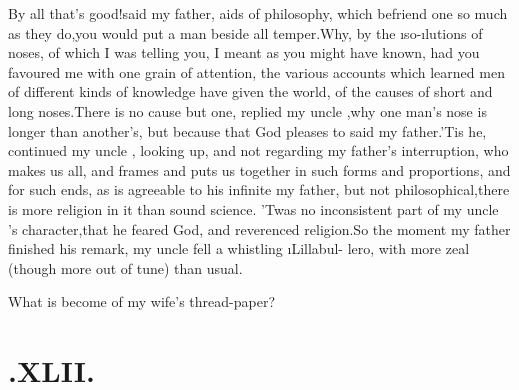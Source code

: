 \documentclass[twoside]{article}
\begin{document}
By all that’s good!\@ said my father, 
aids of philosophy, which befriend one\break
so much as they do,\tsk you would put a\break
man beside all temper.\tsk Why, by the
\i{so}-\break\i{lutions} of noses, of which I was telling you, I meant as
you might have known, had you favoured me with one grain of
attention, the various accounts which\break
learned men of different
kinds of know\-ledge have given the world, of the causes of short and
long noses.\tsk There is no cause but one, replied my
uncle \toby,\tsk why one man’s nose is longer
than ano\-ther’s, but because that God pleases to
 said
my father.\tsk ’Tis he, continued my uncle \toby,
looking up, and not regarding my father’s interruption, who
makes us all, and frames and puts us together in such forms and
proportions, and for such ends, as is agreeable to his
infinite\break\etp
{}
my father,
but not philosophical,\tsk there is more religion in it than sound
science. ’Twas no inconsistent part of my uncle
\toby's character,\tsk that he feared God, and
reverenced religion.\tsh So the moment my father finished
his remark,\tsh\break
my uncle \toby fell a whistling \i{Lillabul-\break 
lero}, with more zeal (though more out\break
of tune) than usual.\tsh

What is become of my wife’s thread-\break paper?

\section{.\quad  XLII.}
\end{document}
